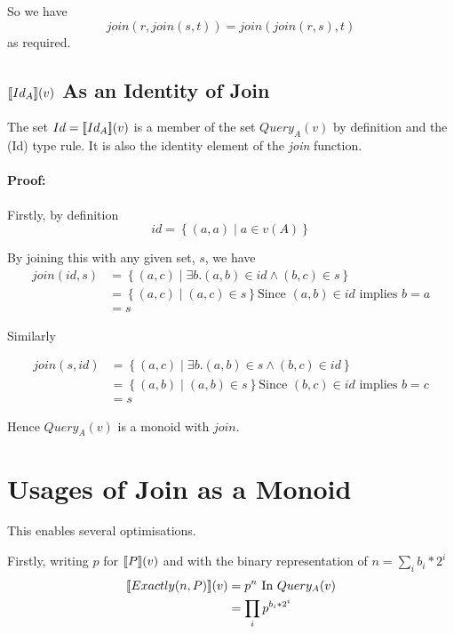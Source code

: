 \documentclass[12pt,a4paper,twoside,openright]{report}
\newcommand\mathName[1]{\textit{#1}}
\newcommand{\db}[1]{{\bf [\![}#1{\bf ]\!]}}
\newcommand{\deno}[1]{\db{#1}(v)}
\newcommand{\setComp}[2]{\left\lbrace #1 \mid #2 \right\rbrace}
\newcommand{\queryT}[1]{Query_{#1}(v)}
\let\oldparagraph\paragraph
\renewcommand{\paragraph}[1]{\oldparagraph{#1}\mbox{}}
\begin{document}
So we have \[ join(r, join(s, t)) = join(join(r, s), t) \] as required.

\subsection{$\deno{Id_A}$ As an Identity of Join}

The set $Id = \deno{Id_A}$ is a member of the set $\queryT{A}$ by definition and the (Id) type rule. It is also the identity element of the \mathName{join} function.

\paragraph{Proof:} Firstly, by definition
\[ id = \setComp{(a, a)}{a \in v(A)}\]

By joining this with any given set, $s$, we have
\begin{equation}
\label{LeftID}
\begin{split}
join(id, s) & = \setComp{(a, c)}{\exists b. (a, b) \in id \wedge (b, c) \in s}\\
            & = \setComp{(a, c)}{(a, c) \in s} \mbox{Since $(a, b) \in id$ implies $b = a$}\\
            & = s
\end{split}
\end{equation}

Similarly

\begin{equation}
\label{RightID}
\begin{split}
join(s, id) & = \setComp{(a, c)}{\exists b. (a, b) \in s \wedge (b, c) \in id}\\
            & = \setComp{(a, b)}{(a, b) \in s} \mbox{Since $(b, c) \in id$ implies $b = c$}\\
            & = s
\end{split}
\end{equation}



Hence $\queryT{A}$ is a monoid with $join$. 
	
\section{Usages of Join as a Monoid}
\label{exactlyOpt}
This enables several optimisations.

Firstly, writing $p$ for $\deno{P}$ and with the binary representation of $n = \sum_i{b_i * 2^{i}}$
\begin{equation}\label{ExactlyReordering}
\begin{split}
\deno{Exactly(n, P)} & = p^{n} \mbox{ In $\queryT{A}$}\\
					& = \prod_i {p^{b_i * 2^i} }
\end{split}
\end{equation}
\end{document}
